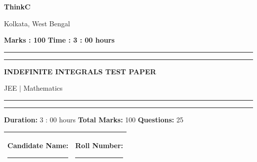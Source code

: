 \documentclass[11pt,a4paper]{article}
\begin{document}
{\centering \large \textbf{ThinkC}\par}
{\centering \footnotesize Kolkata, West Bengal\par}
\vspace{2mm}
\noindent \textbf{Marks : 100} \hfill \textbf{Time : 3 : 00 hours}
\noindent\rule{\linewidth}{1.1pt}\vspace{-1mm}\noindent\rule{\linewidth}{0.5pt}
{\centering \Large \textbf{INDEFINITE INTEGRALS TEST PAPER}\par}
{\centering JEE $|$ Mathematics\par}
\noindent\rule{\linewidth}{1.1pt}\vspace{-1mm}\noindent\rule{\linewidth}{0.5pt}
\vspace{1mm}
\noindent \textbf{Duration:} 3 : 00 hours \quad \textbf{Total Marks:} 100 \quad \textbf{Questions:} 25\par
\vspace{2mm}

\begin{tabularx}{\linewidth}{|X|X|}\hline
Candidate Name: \rule{6cm}{0.4pt} & Roll Number: \rule{3.5cm}{0.4pt} \\\hline
\end{tabularx}
\end{document}
